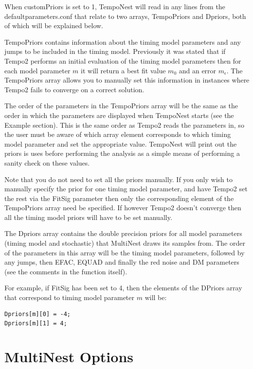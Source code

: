 \documentclass[%
 preprint,
 amsmath,amssymb,amsfonts,
 aps,
]{revtex4-1}
\begin{document}
When customPriors is set to 1, TempoNest will read in any lines from the defaultparameters.conf that relate to two arrays, TempoPriors and Dpriors, both of which will be explained below.

TempoPriors contains information about the timing model parameters and any jumps to be included in the timing model.  Previously it was stated that if Tempo2 performs an initial evaluation of the timing model parameters then for each model parameter $m$ it will return a best fit value $m_0$ and an error $m_{\epsilon}$.  The TempoPriors array allows you to manually set this information in instances where Tempo2 fails to converge on a correct solution.

The order of the parameters in the TempoPriors array will be the same as the order in which the parameters are displayed when TempoNest starts (see the Example section).  This is the same order as Tempo2 reads the parameters in, so the user must be aware of which array element corresponds to which timing model parameter and set the appropriate value.  TempoNest will print out the priors is uses before performing the analysis as a simple means of performing a sanity check on these values.

Note that you do not need to set all the priors manually.  If you only wish to manually specify the prior for one timing model parameter, and have Tempo2 set the rest via the FitSig parameter then only the corresponding element of the TempoPriors array need be specified.  If however Tempo2 doesn't converge then all the timing model priors will have to be set manually.

The Dpriors array contains the double precision priors for all model parameters (timing model and stochastic) that MultiNest draws its samples from.  The order of the parameters in this array will be the timing model parameters, followed by any jumps, then EFAC, EQUAD and finally the red noise and DM  parameters (see the comments in the function itself).

For example, if FitSig has been set to 4, then the elements of the DPriors array that correspond to timing model parameter $m$ will be:

\begin{lstlisting}
Dpriors[m][0] = -4;
Dpriors[m][1] = 4;
\end{lstlisting}



\section{MultiNest Options}
\label{Section:Advanced}
\end{document}
